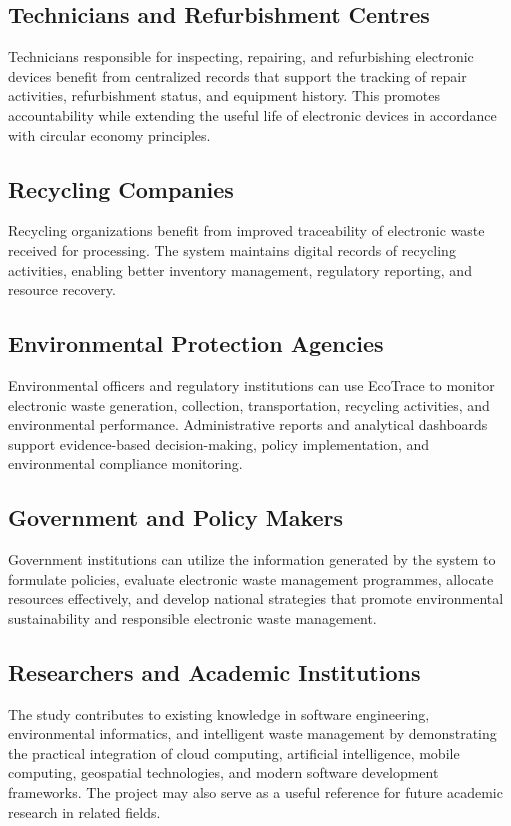 \subsection{Technicians and Refurbishment Centres}
Technicians responsible for inspecting, repairing, and refurbishing electronic devices
benefit from centralized records that support the tracking of repair activities,
refurbishment status, and equipment history. This promotes accountability while
extending the useful life of electronic devices in accordance with circular economy
principles.

\subsection{Recycling Companies}
Recycling organizations benefit from improved traceability of electronic waste
received for processing. The system maintains digital records of recycling activities,
enabling better inventory management, regulatory reporting, and resource recovery.

\subsection{Environmental Protection Agencies}
Environmental officers and regulatory institutions can use EcoTrace to monitor
electronic waste generation, collection, transportation, recycling activities, and
environmental performance. Administrative reports and analytical dashboards support
evidence-based decision-making, policy implementation, and environmental
compliance monitoring.

\subsection{Government and Policy Makers}
Government institutions can utilize the information generated by the system to
formulate policies, evaluate electronic waste management programmes, allocate
resources effectively, and develop national strategies that promote environmental
sustainability and responsible electronic waste management.

\subsection{Researchers and Academic Institutions}
The study contributes to existing knowledge in software engineering, environmental
informatics, and intelligent waste management by demonstrating the practical
integration of cloud computing, artificial intelligence, mobile computing, geospatial
technologies, and modern software development frameworks. The project may also
serve as a useful reference for future academic research in related fields.


